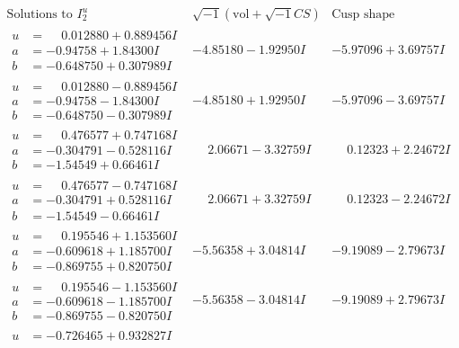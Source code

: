 \documentclass[1p]{elsarticle_modified}
\theoremstyle{definition}
\newcommand{\I}{\sqrt{-1}}
\begin{document}
$$\begin{array}{c|c|c}  
\text{Solutions to }I^u_{2}& \I (\text{vol} + \sqrt{-1}CS) & \text{Cusp shape}\\
 \hline 
\begin{aligned}
u &= \phantom{-}0.012880 + 0.889456 I \\
a &= -0.94758 + 1.84300 I \\
b &= -0.648750 + 0.307989 I\end{aligned}
 & -4.85180 - 1.92950 I & -5.97096 + 3.69757 I \\ \hline\begin{aligned}
u &= \phantom{-}0.012880 - 0.889456 I \\
a &= -0.94758 - 1.84300 I \\
b &= -0.648750 - 0.307989 I\end{aligned}
 & -4.85180 + 1.92950 I & -5.97096 - 3.69757 I \\ \hline\begin{aligned}
u &= \phantom{-}0.476577 + 0.747168 I \\
a &= -0.304791 - 0.528116 I \\
b &= -1.54549 + 0.66461 I\end{aligned}
 & \phantom{-}2.06671 - 3.32759 I & \phantom{-}0.12323 + 2.24672 I \\ \hline\begin{aligned}
u &= \phantom{-}0.476577 - 0.747168 I \\
a &= -0.304791 + 0.528116 I \\
b &= -1.54549 - 0.66461 I\end{aligned}
 & \phantom{-}2.06671 + 3.32759 I & \phantom{-}0.12323 - 2.24672 I \\ \hline\begin{aligned}
u &= \phantom{-}0.195546 + 1.153560 I \\
a &= -0.609618 + 1.185700 I \\
b &= -0.869755 + 0.820750 I\end{aligned}
 & -5.56358 + 3.04814 I & -9.19089 - 2.79673 I \\ \hline\begin{aligned}
u &= \phantom{-}0.195546 - 1.153560 I \\
a &= -0.609618 - 1.185700 I \\
b &= -0.869755 - 0.820750 I\end{aligned}
 & -5.56358 - 3.04814 I & -9.19089 + 2.79673 I \\ \hline\begin{aligned}
u &= -0.726465 + 0.932827 I \\

\end{aligned}
\end{array}$$
\end{document}
